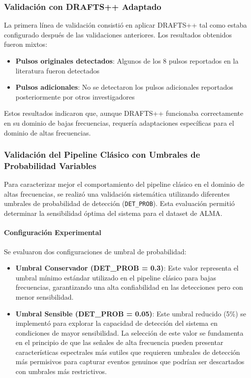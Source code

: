 \subsubsection{Validación con DRAFTS++ Adaptado}

La primera línea de validación consistió en aplicar DRAFTS++ tal como estaba configurado después de las validaciones anteriores. Los resultados obtenidos fueron mixtos:

\begin{itemize}
    \item \textbf{Pulsos originales detectados}: Algunos de los 8 pulsos reportados en la literatura fueron detectados
    \item \textbf{Pulsos adicionales}: No se detectaron los pulsos adicionales reportados posteriormente por otros investigadores
\end{itemize}

Estos resultados indicaron que, aunque DRAFTS++ funcionaba correctamente en su dominio de bajas frecuencias, requería adaptaciones específicas para el dominio de altas frecuencias.

\subsubsection{Validación del Pipeline Clásico con Umbrales de Probabilidad Variables}

Para caracterizar mejor el comportamiento del pipeline clásico en el dominio de altas frecuencias, se realizó una validación sistemática utilizando diferentes umbrales de probabilidad de detección (\texttt{DET\_PROB}). Esta evaluación permitió determinar la sensibilidad óptima del sistema para el dataset de ALMA.

\paragraph{Configuración Experimental}

Se evaluaron dos configuraciones de umbral de probabilidad:

\begin{itemize}
    \item \textbf{Umbral Conservador (DET\_PROB = 0.3)}: Este valor representa el umbral mínimo estándar utilizado en el pipeline clásico para bajas frecuencias, garantizando una alta confiabilidad en las detecciones pero con menor sensibilidad.
    \item \textbf{Umbral Sensible (DET\_PROB = 0.05)}: Este umbral reducido (5\%) se implementó para explorar la capacidad de detección del sistema en condiciones de mayor sensibilidad. La selección de este valor se fundamenta en el principio de que las señales de alta frecuencia pueden presentar características espectrales más sutiles que requieren umbrales de detección más permisivos para capturar eventos genuinos que podrían ser descartados con umbrales más restrictivos.
\end{itemize}

